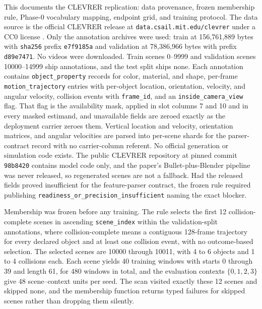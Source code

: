 This  documents the CLEVRER replication: data provenance, frozen membership rule, Phase-0 vocabulary mapping, endpoint grid, and training protocol.
The data source is the official CLEVRER release at \texttt{data.csail.mit.edu/\allowbreak clevrer} under a CC0 license \citep{yi2020clevrer}. Only the annotation archives were used: train at 156{,}761{,}889 bytes with \texttt{sha256} prefix \texttt{e7f9185a} and validation at 78{,}386{,}966 bytes with prefix \texttt{d89e7471}. No videos were downloaded. Train scenes 0--9999 and validation scenes 10000--14999 ship annotations, and the test split ships none. Each annotation contains \texttt{object\_property} records for color, material, and shape, per-frame \texttt{motion\_trajectory} entries with per-object location, orientation, velocity, and angular velocity, collision events with \texttt{frame\_id}, and an \texttt{inside\_camera\_view} flag. That flag is the availability mask, applied in slot columns 7 and 10 and in every masked estimand, and unavailable fields are zeroed exactly as the deployment carrier zeroes them. Vertical location and velocity, orientation matrices, and angular velocities are parsed into per-scene shards for the parser-contract record with no carrier-column referent. No official generation or simulation code exists. The public CLEVRER repository at pinned commit \texttt{98b8420} contains model code only, and the paper's Bullet-plus-Blender pipeline was never released, so regenerated scenes are not a fallback. Had the released fields proved insufficient for the feature-parser contract, the frozen rule required publishing \texttt{readiness\_or\_precision\_\allowbreak insufficient} naming the exact blocker.

Membership was frozen before any training. The rule selects the first 12 collision-complete scenes in ascending \texttt{scene\_index} within the validation-split annotations, where collision-complete means a contiguous 128-frame trajectory for every declared object and at least one collision event, with no outcome-based selection. The selected scenes are 10000 through 10011, with 4 to 6 objects and 1 to 4 collisions each. Each scene yields 40 training windows with starts 0 through 39 and length 61, for 480 windows in total, and the evaluation contexts $\{0,1,2,3\}$ give 48 scene--context units per seed. The scan visited exactly these 12 scenes and skipped none, and the membership function returns typed failures for skipped scenes rather than dropping them silently. 

